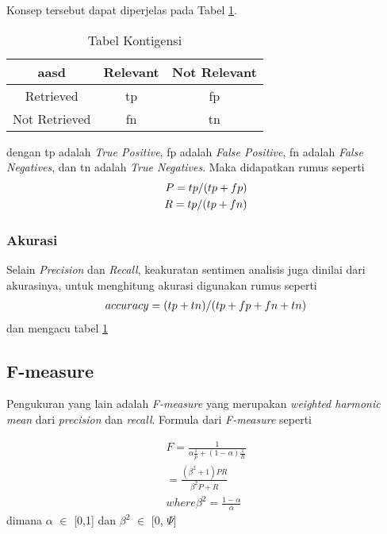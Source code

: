 Konsep tersebut dapat diperjelas pada Tabel \ref{tab:konsep}.

\begin{table}[hbt]
	\caption{Tabel Kontigensi}
	\centering
	\begin{adjustbox}{max width=\textwidth}
		\begin{tabular}{*{3}{c}}%
			\toprule
			aasd & Relevant & Not Relevant \\
			\midrule
			Retrieved & tp & fp \\
			Not Retrieved & fn & tn \\
			\bottomrule
		\end{tabular}
	\end{adjustbox}
	\label{tab:konsep}
\end{table}

dengan tp adalah \textit{True Positive}, fp adalah \textit{False Positive}, fn adalah \textit{False Negatives}, dan tn adalah \textit{True Negatives}. Maka didapatkan rumus seperti 
\begin{equation}
\begin{split}
\tiny
P = tp/(tp+fp) \\ 
R = tp/(tp+fn)
\label{eq:evaluasi}
\normalsize
\end{split}
\end{equation}

\subsubsection*{Akurasi}
Selain \textit{Precision} dan \textit{Recall}, keakuratan sentimen analisis juga dinilai dari akurasinya, untuk menghitung akurasi digunakan rumus seperti
\begin{equation}
\begin{split}
\tiny
accuracy = (tp+tn)/(tp+fp+fn+tn)
\label{eq:akurasi}
\normalsize
\end{split}
\end{equation}
dan mengacu tabel \ref{tab:konsep}
\subsection*{F-measure}
Pengukuran yang lain adalah \textit{F-measure} yang merupakan \textit{weighted harmonic mean} dari \textit{precision} dan \textit{recall}. Formula dari \textit{F-measure} seperti

\begin{equation}
\begin{split}
F = \frac{1}{\alpha \frac{1}{p} + (1 - \alpha)\frac{1}{R}} \\
= \frac{(\beta^2 + 1)PR}{\beta^2P + R} \\
where \beta^2 = \frac{1 - \alpha}{\alpha}
\label{eq:fmeasure}
\end{split}
\end{equation}
dimana $\alpha$ $\in$ [0,1] dan $\beta^2$ $\in$ [0, $\Psi$]

